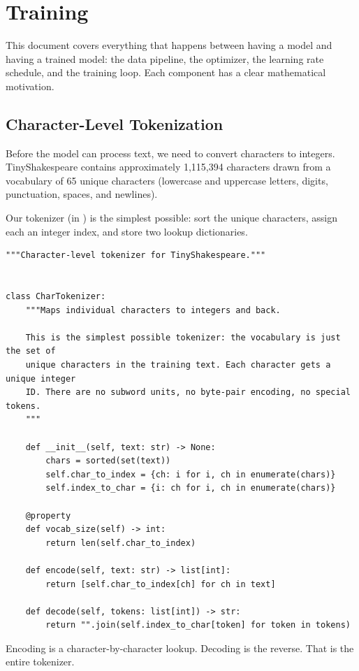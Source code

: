 \chapter{Training}

This document covers everything that happens between having a model and having a trained model: the data pipeline, the optimizer, the learning rate schedule, and the training loop. Each component has a clear mathematical motivation.

\section{Character-Level Tokenization}

Before the model can process text, we need to convert characters to integers. TinyShakespeare contains approximately 1,115,394 characters drawn from a vocabulary of 65 unique characters (lowercase and uppercase letters, digits, punctuation, spaces, and newlines).

Our tokenizer (in ) is the simplest possible: sort the unique characters, assign each an integer index, and store two lookup dictionaries.

\begin{lstlisting}
"""Character-level tokenizer for TinyShakespeare."""


class CharTokenizer:
    """Maps individual characters to integers and back.

    This is the simplest possible tokenizer: the vocabulary is just the set of
    unique characters in the training text. Each character gets a unique integer
    ID. There are no subword units, no byte-pair encoding, no special tokens.
    """

    def __init__(self, text: str) -> None:
        chars = sorted(set(text))
        self.char_to_index = {ch: i for i, ch in enumerate(chars)}
        self.index_to_char = {i: ch for i, ch in enumerate(chars)}

    @property
    def vocab_size(self) -> int:
        return len(self.char_to_index)

    def encode(self, text: str) -> list[int]:
        return [self.char_to_index[ch] for ch in text]

    def decode(self, tokens: list[int]) -> str:
        return "".join(self.index_to_char[token] for token in tokens)
\end{lstlisting}

Encoding is a character-by-character lookup. Decoding is the reverse. That is the entire tokenizer.

